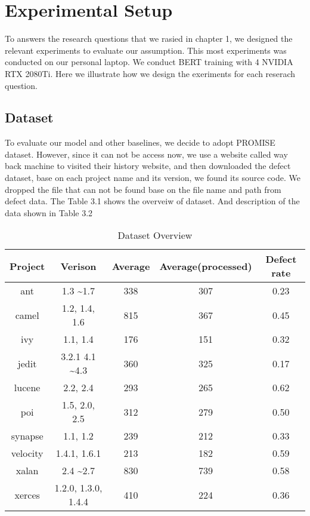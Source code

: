 \chapter{Experimental Setup}
To answers the research questions that we rasied in chapter 1, we designed the relevant experiments to evaluate our assumption. This most experiments was conducted on our personal laptop. We conduct BERT training with 4 NVIDIA RTX 2080Ti. Here we illustrate how we design the exeriments for each reserach question.

\section{Dataset}
To evaluate our model and other baselines, we decide to adopt  PROMISE dataset. However, since it can not be access now, we use a website called way back machine to visited their history website, and then downloaded the defect dataset, base on each project name and its version, we found its source code. We dropped the file that can not be found base on the file name and path from defect data. The Table 3.1 shows the overveiw of dataset. And description of the data shown in Table 3.2

\begin{table}[h]
    \centering
    \begin{tabular}{c|c|c|c|c}
    \toprule[2pt]
        Project &  Verison & Average & Average(processed) & Defect rate \\
    \toprule[1pt]
        ant &  1.3 \sim 1.7 & 338 & 307 & 0.23 \\
        camel &  1.2, 1.4, 1.6 & 815 & 367 & 0.45 \\
        ivy &  1.1, 1.4 & 176 & 151 & 0.32 \\
        jedit &  3.2.1 4.1 \sim 4.3 & 360 & 325 & 0.17 \\
        lucene &  2.2, 2.4 & 293 & 265 & 0.62 \\
        poi &  1.5, 2.0, 2.5 & 312 & 279 & 0.50 \\
        synapse & 1.1, 1.2 & 239 & 212 & 0.33 \\
        velocity &  1.4.1, 1.6.1 & 213 & 182 & 0.59 \\
        xalan &  2.4 \sim 2.7 & 830 & 739 & 0.58 \\
        xerces &  1.2.0, 1.3.0, 1.4.4 & 410 & 224 & 0.36 \\

    \toprule[2pt]
    \end{tabular}
    \caption{Dataset Overview}
    \label{tab:my_label}
\end{table}

